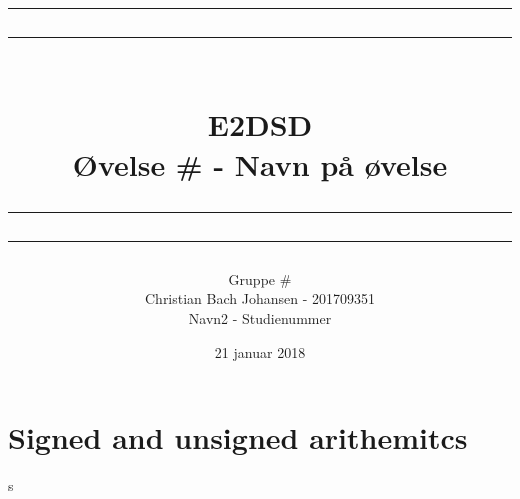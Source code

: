 \documentclass[12pt,a4paper]{article}
\newcommand\mymaketitle[1]{
   \rule{\textwidth}{1.6pt}\vspace*{-\baselineskip}\vspace*{2pt}
   \rule{\textwidth}{0.4pt}
   \\  
   \huge \bf #1\\
   \vspace{-8pt}
   \rule{\textwidth}{0.4pt}\vspace*{-\baselineskip}\vspace{3.2pt}
   \rule{\textwidth}{1.6pt}
}
\begin{document}
\title{
	\mymaketitle{E2DSD\\Øvelse \# - Navn på øvelse}
}
\author{
	Gruppe \#\\
	Christian Bach Johansen - 201709351\\
	Navn2 - Studienummer
}
\date{21 januar 2018}

\maketitle



\section{Signed and unsigned arithemitcs}
s

\end{document}

